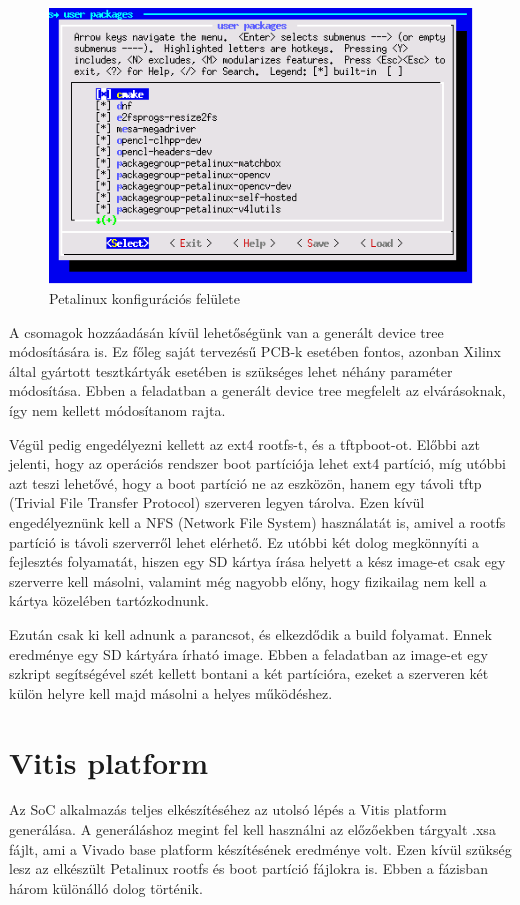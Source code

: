 \begin{figure}[!ht]
    \centering
    \includegraphics[width=150mm, keepaspectratio]{figures/plnx.png}
    \caption{Petalinux konfigurációs felülete}
\end{figure}

A csomagok hozzáadásán kívül lehetőségünk van a generált device tree módosítására is. Ez főleg saját tervezésű PCB-k esetében fontos, azonban Xilinx által gyártott tesztkártyák esetében is szükséges lehet néhány paraméter módosítása. Ebben a feladatban a generált device tree megfelelt az elvárásoknak, így nem kellett módosítanom rajta.

Végül pedig engedélyezni kellett az ext4 rootfs-t, és a tftpboot-ot. Előbbi azt jelenti, hogy az operációs rendszer boot partíciója lehet ext4 partíció, míg utóbbi azt teszi lehetővé, hogy a boot partíció ne az eszközön, hanem egy távoli tftp (Trivial File Transfer Protocol) szerveren legyen tárolva. Ezen kívül engedélyeznünk kell a NFS (Network File System) használatát is, amivel a rootfs partíció is távoli szerverről lehet elérhető. Ez utóbbi két dolog megkönnyíti a fejlesztés folyamatát, hiszen egy SD kártya írása helyett a kész image-et csak egy szerverre kell másolni, valamint még nagyobb előny, hogy fizikailag nem kell a kártya közelében tartózkodnunk.

Ezután csak ki kell adnunk a  parancsot, és elkezdődik a build folyamat. Ennek eredménye egy SD kártyára írható image. Ebben a feladatban az image-et egy szkript segítségével szét kellett bontani a két partícióra, ezeket a szerveren két külön helyre kell majd másolni a helyes működéshez.

\section{Vitis platform}
Az SoC alkalmazás teljes elkészítéséhez az utolsó lépés a Vitis platform generálása. A generáláshoz megint fel kell használni az előzőekben tárgyalt .xsa fájlt, ami a Vivado base platform készítésének eredménye volt. Ezen kívül szükség lesz az elkészült Petalinux rootfs és boot partíció fájlokra is. Ebben a fázisban három különálló dolog történik.


